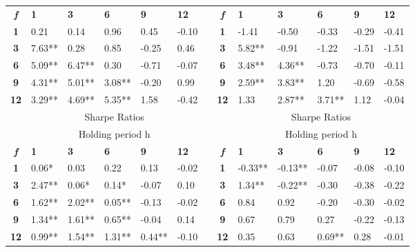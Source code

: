 \documentclass{article}
\begin{document}
\begin{table}[htpb!]
\begin{adjustwidth}{-1.5cm}{}
\begin{tabular}{clllllrclllll}
    \textit{\textbf{f}} & \textbf{1} & \textbf{3} & \textbf{6} & \textbf{9} & \textbf{12} &       & \textit{\textbf{f}} & \textbf{1} & \textbf{3} & \textbf{6} & \textbf{9} & \textbf{12} \\
\cmidrule{2-6}\cmidrule{9-13}    \textbf{1} & 0.21  & 0.14  & 0.96  & 0.45  & -0.10 &       & \textbf{1} & -1.41 & -0.50 & -0.33 & -0.29 & -0.41 \\
    \textbf{3} & 7.63** & 0.28  & 0.85  & -0.25 & 0.46  &       & \textbf{3} & 5.82** & -0.91 & -1.22 & -1.51 & -1.51 \\
    \textbf{6} & 5.09** & 6.47** & 0.30  & -0.71 & -0.07 &       & \textbf{6} & 3.48** & 4.36** & -0.73 & -0.70 & -0.11 \\
    \textbf{9} & 4.31** & 5.01** & 3.08** & -0.20 & 0.99  &       & \textbf{9} & 2.59** & 3.83** & 1.20  & -0.69 & -0.58 \\
    \textbf{12} & 3.29** & 4.69** & 5.35** & 1.58  & -0.42 &       & \textbf{12} & 1.33  & 2.87** & 3.71** & 1.12  & -0.04 \\
    \midrule
          & \multicolumn{5}{c}{Sharpe Ratios}     &       &       & \multicolumn{5}{c}{Sharpe Ratios} \\
    \midrule
          & \multicolumn{5}{c}{Holding period h}  &       &       & \multicolumn{5}{c}{Holding period h} \\
    \textit{\textbf{f}} & \textbf{1} & \textbf{3} & \textbf{6} & \textbf{9} & \textbf{12} &       & \textit{\textbf{f}} & \textbf{1} & \textbf{3} & \textbf{6} & \textbf{9} & \textbf{12} \\
\cmidrule{2-6}\cmidrule{9-13}    \textbf{1} & 0.06* & 0.03  & 0.22  & 0.13  & -0.02 &       & \textbf{1} & -0.33** & -0.13** & -0.07 & -0.08 & -0.10 \\
    \textbf{3} & 2.47** & 0.06* & 0.14* & -0.07 & 0.10  &       & \textbf{3} & 1.34** & -0.22** & -0.30 & -0.38 & -0.22 \\
    \textbf{6} & 1.62** & 2.02** & 0.05** & -0.13 & -0.02 &       & \textbf{6} & 0.84  & 0.92  & -0.20 & -0.30 & -0.02 \\
    \textbf{9} & 1.34** & 1.61** & 0.65** & -0.04 & 0.14  &       & \textbf{9} & 0.67  & 0.79  & 0.27  & -0.22 & -0.13 \\
    \textbf{12} & 0.99** & 1.54** & 1.31** & 0.44** & -0.10 &       & \textbf{12} & 0.35  & 0.63  & 0.69** & 0.28  & -0.01 \\
    \bottomrule
    \end{tabular}%
    \end{adjustwidth}
  \label{EWTCR}%
\end{table}%
\end{document}
